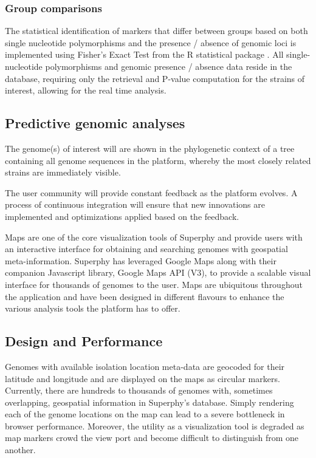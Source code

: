 \documentclass{bmcart}
\begin{document}
\subsubsection{Group comparisons}
The statistical identification of markers that differ between groups based on both single nucleotide polymorphisms and the presence / absence of genomic loci is implemented using Fisher’s Exact Test from the R statistical package \cite{r_foundation_for_statistical_computing_r:_2005}. All single-nucleotide polymorphisms and genomic presence / absence data reside in the database, requiring only the retrieval and P-value computation for the strains of interest, allowing for the real time analysis.

\subsection{Predictive genomic analyses}

The genome(s) of interest will are shown in the phylogenetic context of a tree containing all genome sequences in the platform, whereby the most closely related strains are immediately visible.

The user community will provide constant feedback as the platform evolves. A process of continuous integration will ensure that new innovations are implemented and optimizations applied based on the feedback.

Maps are one of the core visualization tools of Superphy and provide users with an interactive interface for obtaining and searching genomes with geospatial meta-information. Superphy has leveraged Google Maps along with their companion Javascript library, Google Maps API (V3), to provide a scalable visual interface for thousands of genomes to the user. Maps are ubiquitous throughout the application and have been designed in different flavours to enhance the various analysis tools the platform has to offer.

\subsection{Design and Performance}
Genomes with available isolation location meta-data are geocoded for their latitude and longitude and  are displayed on the maps as circular markers. Currently, there are hundreds to thousands of genomes with, sometimes overlapping, geospatial information in Superphy's database. Simply rendering each of the genome locations on the map can lead to a severe bottleneck in browser performance. Moreover, the utility as a visualization tool is degraded as map markers crowd the view port and become difficult to distinguish from one another.\\
\end{document}
